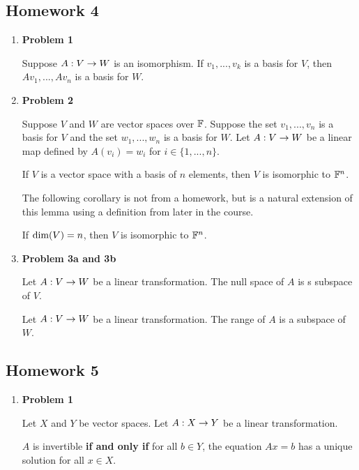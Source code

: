\subsection{Homework 4}
\begin{enumerate}
    \item[] \textbf{Problem 1}
    \begin{lemma}
        Suppose $A : V \rightarrow W$ is an isomorphism. If $v_1, ..., v_k$ is a basis for $V$, then $Av_1, ..., Av_n$ is a basis for $W$.
    \end{lemma}
    \item[] \textbf{Problem 2}
    \begin{lemma}
        Suppose $V$ and $W$ are vector spaces over $\mathbb{F}$. Suppose the set $v_1, ..., v_n$ is a basis for $V$ and the set $w_1, ..., w_n$ is a basis
        for $W$. Let $A : V \rightarrow W$ be a linear map defined by $A(v_i) = w_i$ for $i \in \{1, ..., n\}$.

        If $V$ is a vector space with a basis of $n$ elements, then $V$ is isomorphic to $\mathbb{F}^n$.
    \end{lemma}

    The following corollary is not from a homework, but is a natural extension of this lemma using a definition from later in the course.
    \begin{corollary}
        If $\text{dim}(V) = n$, then $V$ is isomorphic to $\mathbb{F}^n$.
    \end{corollary} 

    \item[] \textbf{Problem 3a and 3b} 
    \begin{lemma}
        Let $A : V \rightarrow W$ be a linear transformation. The null space of $A$ is s subspace of $V$.
    \end{lemma}
    \begin{lemma}
        Let $A : V \rightarrow W$ be a linear transformation. The range of $A$ is a subspace of $W$.
    \end{lemma}

\end{enumerate}

\subsection{Homework 5}
\begin{enumerate}
    \item[] \textbf{Problem 1}
    \begin{lemma}
        Let $X$ and $Y$ be vector spaces. Let $A : X \rightarrow Y$ be a linear transformation.

        $A$ is invertible \textbf{if and only if} for all $b \in Y$, the equation $Ax = b$ has a unique solution for all $x \in X$.
    \end{lemma}
\end{enumerate}

